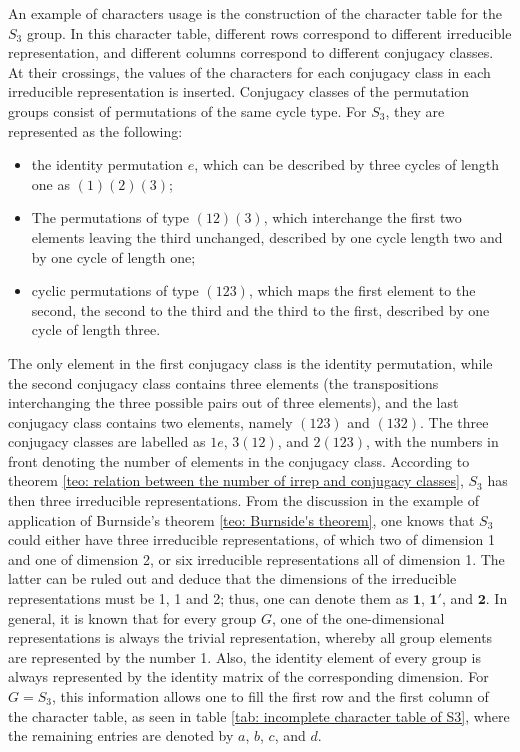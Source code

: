 \begin{ex}
    An example of characters usage is the construction of the character table for the $S_3$ group. In this character table, different rows correspond to different irreducible representation, and different columns correspond to different conjugacy classes. At their crossings, the values of the characters for each conjugacy class in each irreducible representation is inserted. Conjugacy classes of the permutation groups consist of permutations of the same cycle type. For $S_3$, they are represented as the following:
    \begin{itemize}
        \item the identity permutation $e$, which can be described by three cycles of length one as $(1)(2)(3)$;
        \item The permutations of type $(12)(3)$, which interchange the first two elements leaving the third unchanged, described by one cycle length two and by one cycle of length one;
        \item cyclic permutations of type $(123)$, which maps the first element to the second, the second to the third and the third to the first, described by one cycle of length three.
    \end{itemize}
    The only element in the first conjugacy class is the identity permutation, while the second conjugacy class contains three elements (the transpositions interchanging the three possible pairs out of three elements), and the last conjugacy class contains two elements, namely $(123)$ and $(132)$. The three conjugacy classes are labelled as $1e$, $3(12)$, and $2(123)$, with the numbers in front denoting the number of elements in the conjugacy class. According to theorem \ref{teo: relation between the number of irrep and conjugacy classes}, $S_3$ has then three irreducible representations. From the discussion in the example of application of Burnside's theorem \ref{teo: Burnside's theorem}, one knows that $S_3$ could either have three irreducible representations, of which two of dimension 1 and one of dimension 2, or six irreducible representations all of dimension 1. The latter can be ruled out and deduce that the dimensions of the irreducible representations must be 1, 1 and 2; thus, one can denote them as $\bm{1}$, $\bm{1'}$, and $\bm{2}$. In general, it is known that for every group $G$, one of the one-dimensional representations is always the trivial representation, whereby all group elements are represented by the number 1. Also, the identity element of every group is always represented by the identity matrix of the corresponding dimension. For $G = S_3$, this information allows one to fill the first row and the first column of the character table, as seen in table \ref{tab: incomplete character table of S3}, where the remaining entries are denoted by $a$, $b$, $c$, and $d$.

\end{ex}
